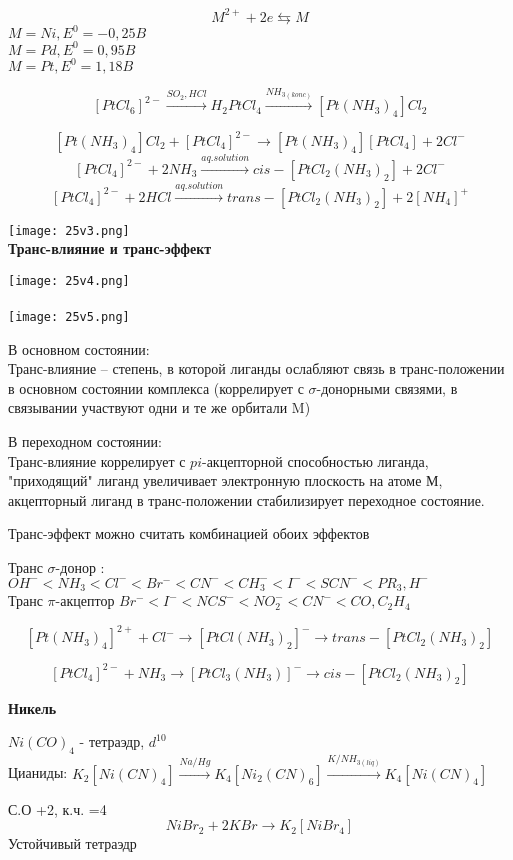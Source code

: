 $$M^{2+} + 2e \leftrightarrows M$$
$M = Ni, E^0 = -0,25 B$\\
$M = Pd, E^0 = 0,95 B$\\
$M = Pt, E^0 = 1,18 B$

$$[PtCl_6]^{2-} \xrightarrow{SO_2, HCl} H_2PtCl_4 \xrightarrow{NH_{3(konc)}} [Pt(NH_3)_4]Cl_2$$

$$[Pt(NH_3)_4]Cl_2 + [PtCl_4]^{2-} \rightarrow [Pt(NH_3)_4][PtCl_4] + 2Cl^-$$
$$[PtCl_4]^{2-} + 2NH_3\xrightarrow{aq.solution} cis-[PtCl_2(NH_3)_2] + 2Cl^-$$
$$[PtCl_4]^{2-} + 2HCl \xrightarrow{aq. solution} trans-[PtCl_2(NH_3)_2] + 2[NH_4]^+$$

\texttt{[image: 25v3.png]}
\\

\textbf{Транс-влияние и транс-эффект}

\texttt{[image: 25v4.png]}\\
\\

\texttt{[image: 25v5.png]}

В основном состоянии:\\
Транс-влияние -- степень, в которой лиганды ослабляют связь в транс-положении в основном состоянии комплекса (коррелирует с $\sigma$-донорными связями, в связывании участвуют одни и те же орбитали M)

В переходном состоянии:\\
Транс-влияние коррелирует с $pi$-акцепторной способностью лиганда, "приходящий" лиганд увеличивает электронную плоскость на атоме М, акцепторный лиганд в транс-положении стабилизирует переходное состояние.

Транс-эффект можно считать комбинацией обоих эффектов

Транс $\sigma$-донор : $OH^- < NH_3 < Cl^- < Br^- < CN^- < CH_3^- <I^- < SCN^- < PR_3 , H^-$\\
Транс $\pi$-акцептор $Br^- < I^- < NCS^- < NO_2^- < CN^- < CO , C_2H_4$

$$[Pt(NH_3)_4]^{2+} + Cl^- \rightarrow [PtCl(NH_3)_2]^- \rightarrow trans-[PtCl_2(NH_3)_2]$$

$$[PtCl_4]^{2-} + NH_3 \rightarrow [PtCl_3(NH_3)]^- \rightarrow cis-[PtCl_2(NH_3)_2]$$

\textbf{Никель}

$Ni(CO)_4$ - тетраэдр, $d^{10}$\\
Цианиды: $K_2[Ni(CN)_4] \xrightarrow{Na/Hg} K_4[Ni_2(CN)_6] \xrightarrow{K/NH_{3(liq)}} K_4[Ni(CN)_4]$

С.О +2, к.ч. =4\\
$$NiBr_2 + 2KBr \rightarrow K_2[NiBr_4]$$
Устойчивый тетраэдр

